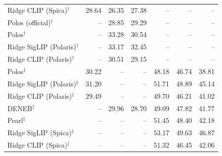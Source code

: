 \begin{tabular}{lrrrrrr}
Ridge CLIP (Spica)$^{\dagger}$ & 28.64 & 26.35 & 27.38 & -- & -- & -- \\
Polos (official)$^{\dagger}$ & -- & 28.85 & 29.29 & -- & -- & -- \\
Polos$^{\dagger}$ & -- & 33.28 & 30.54 & -- & -- & -- \\
Ridge SigLIP (Polaris)$^{\dagger}$ & -- & 33.17 & 32.45 & -- & -- & -- \\
Ridge CLIP (Polaris)$^{\dagger}$ & -- & 30.51 & 29.15 & -- & -- & -- \\
\addlinespace
Polos$^{\ddagger}$ & 30.22 & -- & -- & 48.18 & 46.74 & 38.81 \\
Ridge SigLIP (Polaris)$^{\ddagger}$ & 31.20 & -- & -- & 51.71 & 48.89 & 45.14 \\
Ridge CLIP (Polaris)$^{\ddagger}$ & 29.49 & -- & -- & 49.70 & 46.21 & 41.02 \\
DENEB$^{\ddagger}$ & -- & 29.96 & 28.70 & 49.09 & 47.82 & 41.77 \\
Pearl$^{\ddagger}$ & -- & -- & -- & 51.45 & 48.40 & 42.18 \\
Ridge SigLIP (Spica)$^{\ddagger}$ & -- & -- & -- & 53.17 & 49.63 & 46.87 \\
Ridge CLIP (Spica)$^{\ddagger}$ & -- & -- & -- & 51.32 & 46.45 & 42.06 \\
\bottomrule
\end{tabular}
